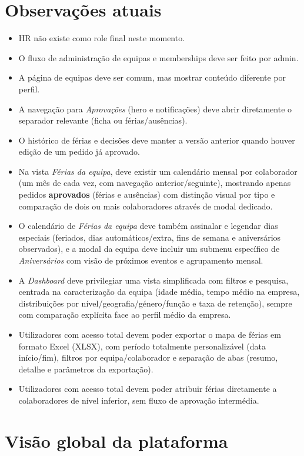 \documentclass[11pt,a4paper]{article}
\begin{document}
\section{Observações atuais}
\begin{itemize}
  \item HR não existe como role final neste momento.
  \item O fluxo de administração de equipas e memberships deve ser feito por admin.
  \item A página de equipas deve ser comum, mas mostrar conteúdo diferente por perfil.
  \item A navegação para \textit{Aprovações} (hero e notificações) deve abrir diretamente o separador relevante (ficha ou férias/ausências).
  \item O histórico de férias e decisões deve manter a versão anterior quando houver edição de um pedido já aprovado.
  \item Na vista \textit{Férias da equipa}, deve existir um calendário mensal por colaborador (um mês de cada vez, com navegação anterior/seguinte), mostrando apenas pedidos \textbf{aprovados} (férias e ausências) com distinção visual por tipo e comparação de dois ou mais colaboradores através de modal dedicado.
  \item O calendário de \textit{Férias da equipa} deve também assinalar e legendar dias especiais (feriados, dias automáticos/extra, fins de semana e aniversários observados), e a modal da equipa deve incluir um submenu específico de \textit{Aniversários} com visão de próximos eventos e agrupamento mensal.
  \item A \textit{Dashboard} deve privilegiar uma vista simplificada com filtros e pesquisa, centrada na caracterização da equipa (idade média, tempo médio na empresa, distribuições por nível/geografia/género/função e taxa de retenção), sempre com comparação explícita face ao perfil médio da empresa.
  \item Utilizadores com acesso total devem poder exportar o mapa de férias em formato Excel (XLSX), com período totalmente personalizável (data início/fim), filtros por equipa/colaborador e separação de abas (resumo, detalhe e parâmetros da exportação).
  \item Utilizadores com acesso total devem poder atribuir férias diretamente a colaboradores de nível inferior, sem fluxo de aprovação intermédia.
\end{itemize}

\section{Visão global da plataforma}
\end{document}

